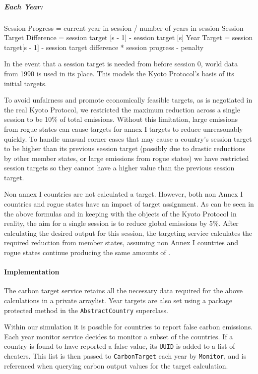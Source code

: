 \subparagraph{Each Year:}
Session Progress = current year in session / number of years in session
Session Target Difference = session target [s - 1] - session target [s]
Year Target = session target[s - 1] - session target difference * session progress - penalty

In the event that a session target is needed from before session 0, world data from 1990 is used in its place. This models the Kyoto Protocol's basis of its initial targets.
 
To avoid unfairness and promote economically feasible targets, as is negotiated in the real Kyoto Protocol, we restricted the maximum reduction across a single session to be 10\% of total emissions. Without this limitation, large emissions from rogue states can cause targets for annex I targets to reduce unreasonably quickly. To handle unusual corner cases that may cause a country's session target to be higher than its previous session target (possibly due to drastic reductions by other member states, or large emissions from rogue states) we have restricted session targets so they cannot have a higher value than the previous session target.
 
Non annex I countries are not calculated a target. However, both non Annex I countries and rogue states have an impact of target assignment. As can be seen in the above formulas and in keeping with the objects of the Kyoto Protocol in reality, the aim for a single session is to reduce global \CO emissions by 5\%. After calculating the desired output for this session, the targeting service calculates the required reduction from member states, assuming non Annex I countries and rogue states continue producing the same amounts of \CO.

\paragraph{Implementation}

The carbon target service retains all the necessary data required for the above calculations in a private arraylist. Year targets are also set using a package protected method in the \texttt{AbstractCountry} superclass.
 
Within our simulation it is possible for countries to report false carbon emissions. Each year monitor service decides to monitor a subset of the countries. If a country is found to have reported a false value, its \texttt{UUID} is added to a list of cheaters. This list is then passed to \texttt{CarbonTarget} each year by \texttt{Monitor}, and is referenced when querying carbon output values for the target calculation.
 
